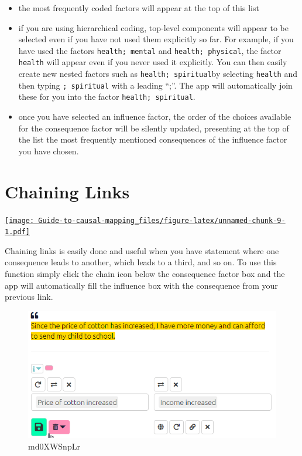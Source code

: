 \documentclass[
]{book}
\providecommand{\tightlist}{%
  \setlength{\itemsep}{0pt}\setlength{\parskip}{0pt}}
\begin{document}
\begin{itemize}
\tightlist
\item
  the most frequently coded factors will appear at the top of this list
\item
  if you are using hierarchical coding, top-level components will appear to be selected even if you have not used them explicitly so far. For example, if you have used the factors \texttt{health;\ mental} and \texttt{health;\ physical}, the factor \texttt{health} will appear even if you never used it explicitly. You can then easily create new nested factors such as \texttt{health;\ spiritual}by selecting \texttt{health} and then typing \texttt{;\ spiritual} with a leading ``;''. The app will automatically join these for you into the factor \texttt{health;\ spiritual}.
\item
  once you have selected an influence factor, the order of the choices available for the consequence factor will be silently updated, presenting at the top of the list the most frequently mentioned consequences of the influence factor you have chosen.
\end{itemize}

\hypertarget{xchaining-links}{%
\section{Chaining Links}\label{xchaining-links}}

\href{https://player.vimeo.com/video/588881701}{\texttt{[image: Guide-to-causal-mapping\_files/figure-latex/unnamed-chunk-9-1.pdf]}}

Chaining links is easily done and useful when you have statement where one consequence leads to another, which leads to a third, and so on. To use this function simply click the chain icon below the consequence factor box and the app will automatically fill the influence box with the consequence from your previous link.

\begin{figure}
\centering
\includegraphics[width=6.77083in,height=\textheight]{_assets/md0XWSnpLr.gif}
\caption{md0XWSnpLr}
\end{figure}
\end{document}
